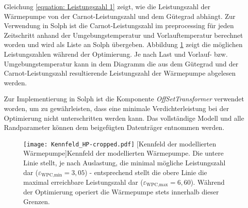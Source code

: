 Gleichung \ref{equation: Leistungszahl 1} zeigt, wie die Leistungszahl der Wärmepumpe von der Carnot-Leistungszahl und dem Gütegrad abhängt. Zur Verwendung in Solph ist die Carnot-Leistungszahl im preprocessing für jeden Zeitschritt anhand der Umgebungstemperatur und Vorlauftemperatur berechnet worden und wird als Liste an Solph übergeben. Abbildung \ref{fig: Kennfeld_HP} zeigt die möglichen Leistungszahlen während der Optimierung. Je nach Last und Vorlauf- bzw. Umgebungstemperatur kann in dem Diagramm die aus dem Gütegrad und der Carnot-Leistungszahl resultierende Leistungszahl der Wärmepumpe abgelesen werden.

Zur Implementierung in Solph ist die Komponente \textit{OffSetTransformer} verwendet worden, um zu gewährleisten, dass eine minimale Verdichterleistung bei der Optimierung nicht unterschritten werden kann. Das vollständige Modell und alle Randparameter können dem beigefügten Datenträger entnommen werden.

	\begin{figure}[ht]
		\centering
		\texttt{[image: Kennfeld\_HP-cropped.pdf]}
		[Kennfeld der modellierten Wärmepumpe]{Kennfeld der modellierten Wärmepumpe. Die untere Linie stellt, je nach Auslastung, die minimal mögliche Leistungszahl dar ($\varepsilon_\text{WPC,min}=3,05$) - entsprechend stellt die obere Linie die maximal erreichbare Leistungszahl dar ($\varepsilon_\text{WPC,max}=6,60$). Während der Optimierung operiert die Wärmepumpe stets innerhalb dieser Grenzen.}
		\label{fig: Kennfeld_HP}
	\end{figure}

